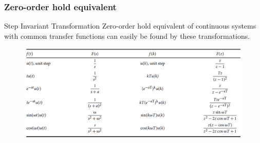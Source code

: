 \begin{frame}
	\frametitle{Zero-order hold equivalent}
	\begin{block}{Step Invariant Transformation}
		Zero-order hold equivalent of continuous systems with common transfer functions can easily be found by these transformations.
		\vspace{-1em}
		\begin{figure}
			\centering
			\includegraphics[width=1\linewidth]{step_inv}
		\end{figure}
	\end{block}
\end{frame}

